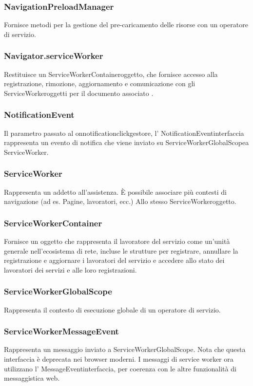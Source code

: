 \documentclass[italian]{article}
\begin{document}
\subsubsection{NavigationPreloadManager}
Fornisce metodi per la gestione del pre-caricamento delle risorse con un operatore di servizio.
\subsubsection{Navigator.serviceWorker}
Restituisce un ServiceWorkerContaineroggetto, che fornisce accesso alla registrazione, rimozione, aggiornamento e comunicazione con gli ServiceWorkeroggetti per il documento associato .
\subsubsection{NotificationEvent}
Il parametro passato al onnotificationclickgestore, l' NotificationEventinterfaccia rappresenta un evento di notifica che viene inviato su ServiceWorkerGlobalScopea ServiceWorker.
\subsubsection{ServiceWorker}
Rappresenta un addetto all'assistenza. È possibile associare più contesti di navigazione (ad es. Pagine, lavoratori, ecc.) Allo stesso ServiceWorkeroggetto.
\subsubsection{ServiceWorkerContainer}
Fornisce un oggetto che rappresenta il lavoratore del servizio come un'unità generale nell'ecosistema di rete, incluse le strutture per registrare, annullare la registrazione e aggiornare i lavoratori del servizio e accedere allo stato dei lavoratori dei servizi e alle loro registrazioni.
\subsubsection{ServiceWorkerGlobalScope}
Rappresenta il contesto di esecuzione globale di un operatore di servizio.
\subsubsection{ServiceWorkerMessageEvent}
Rappresenta un messaggio inviato a ServiceWorkerGlobalScope. Nota che questa interfaccia è deprecata nei browser moderni. I messaggi di service worker ora utilizzano l' MessageEventinterfaccia, per coerenza con le altre funzionalità di messaggistica web.
\end{document}
